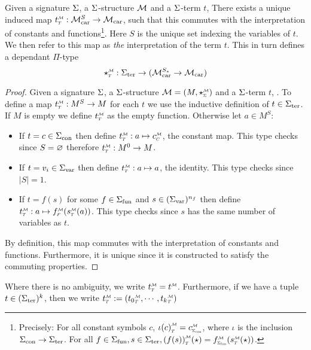 \begin{dfn}
    Given a signature $\Sigma$, 
    a $\Sigma$-structure $\mathcal{M}$ and a $\Sigma$-term $t$, 
    There exists a unique induced map 
    $\subintp{T}{\MM}{t} : \carrier{\MM}^S \to \carrier{\MM}$, 
    such that this commutes with the interpretation of constants and
    functions\footnote{Precisely:
        For all constant symbols $c$, 
        $\subintp{T}{\MM}{\iota(c)} = \subintp{\const{\Si}}{\MM}{c}$,
        where $\iota$ is the inclusion ${\Sigma}_\mathrm{con} \to {\Sigma}_\mathrm{ter}$.
        For all $f \in \func{\Si}, s \in \term{\Si}, 
        \subintp{T}{\MM}{(f(s))}(\star) = 
        \subintp{\func{\Si}}{\MM}{f}(\subintp{T}{\MM}{s}(\star))$.
        }.
    Here $S$ is the unique set indexing the variables of $t$.
    We then refer to this map as \emph{the} interpretation of the term $t$.
    This in turn defines a dependant
    $\Pi$-type 
    \[\intp{T}{\MM}: \term{\Si} \to (\carrier{\MM}^{S_*} \to \carrier{\MM})\]
\end{dfn}
\begin{proof}
    Given a signature $\Sigma$, 
    a $\Sigma$-structure $\MM = (M, \intp{\Si}{\MM})$ and a $\Sigma$-term $t$, 
    .
    To define a map $\subintp{T}{\MM}{t} : M^S \to M$ for each
    $t$ we use the inductive definition of $t \in {\Sigma}_\mathrm{ter}$.
    If $M$ is empty we define $\subintp{T}{\MM}{t}$ as the empty function.
    Otherwise let $a \in M^S$:
    \begin{itemize} 
        \item If $t = c \in {\Sigma}_\mathrm{con}$ then define 
        $\subintp{T}{\MM}{t} : a \mapsto \subintp{C}{\MM}{c}$, 
        the constant map.
        This type checks since $S = \varnothing$ 
        therefore $\subintp{T}{\MM}{t} : M^0 \to M$.
        \item If $t = v_i \in {\Sigma}_\mathrm{var}$
        then define $\subintp{T}{\MM}{t} : a \mapsto a$, the identity.
        This type checks since $|S| = 1$.
        \item If $t = f(s)$ for some $f \in {\Sigma}_\mathrm{fun}$ and 
        $s \in ({\Sigma}_\mathrm{var})^{n_f}$ then define 
        $\subintp{T}{\MM}{t} : a \mapsto \subintp{F}{\MM}{f}(\subintp{T}{\MM}{s}(a))$.
        This type checks since $s$ has the same number of variables as $t$.
    \end{itemize}
    By definition, 
    this map commutes with the interpretation of constants and functions.
    Furthermore, 
    it is unique since it is constructed to satisfy the commuting properties.
\end{proof}
Where there is no ambiguity, 
we write $\subintp{T}{\MM}{t} = \modintp{\MM}{t}$.
Furthermore, if we have a tuple 
$t \in ({\Sigma}_\mathrm{ter})^k$,
then we write $\subintp{T}{\MM}{t}:= 
(\subintp{T}{\MM}{t_0},\cdots,\subintp{T}{\MM}{t_k})$
    
